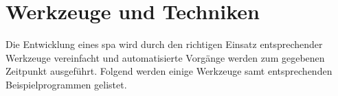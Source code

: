 \section{Werkzeuge und Techniken}
Die Entwicklung eines \ac{spa} wird durch den richtigen Einsatz entsprechender Werkzeuge vereinfacht und automatisierte Vorgänge werden zum gegebenen Zeitpunkt ausgeführt. Folgend werden einige Werkzeuge samt entsprechenden Beispielprogrammen gelistet.





